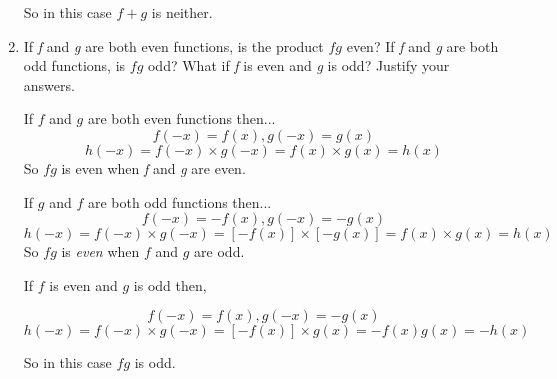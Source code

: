 \documentclass{article}
\begin{document}
\begin{enumerate}
		So in this case $f + g$ is neither.
		
	\item If \emph{f} and \emph{g} are both even functions, is the product $fg$ even? If
		\emph{f} and \emph{g} are both odd functions, is $fg$ odd? What if \emph{f} is even
		and \emph{g} is odd? Justify your answers.
		
		If $f$ and $g$ are both even functions then...
		$$ f(-x) = f(x), g(-x) = g(x)$$
		$$h(-x) = f(-x) \times g(-x) = f(x) \times g(x) = h(x)$$
		So $fg$ is even when \emph{f} and \emph{g} are even.
		
		If $g$ and $f$ are both odd functions then...
		$$f(-x) = - f(x), g(-x) = -g(x)$$
		$$h(-x) = f(-x) \times g(-x) = [-f(x)] \times [-g(x)] = f(x) \times g(x) =  h(x)$$
		So $fg$ is \emph{even} when $f$ and $g$ are odd.
		
		If $f$ is even and $g$ is odd then,
		
		$$ f(-x) = f(x), g(-x) = -g(x)$$
		$$h(-x) = f(-x) \times g(-x) = [-f(x)] \times g(x) = - f(x) g(x) = - h(x)$$

		So in this case $fg$ is odd.
		
	\end{enumerate}
	
\end{document}
